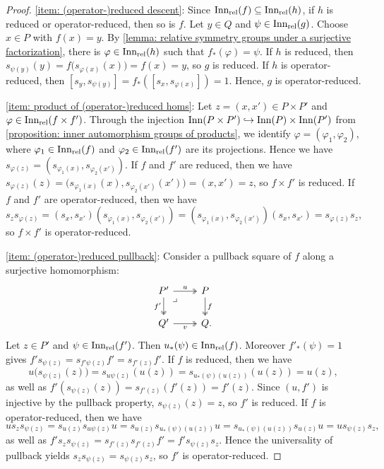 \begin{proof}
\eqref{item: (operator-)reduced descent}:
Since $\operatorname{Inn_{rel}}(f)\subseteq\operatorname{Inn_{rel}}(h)$, if $h$ is reduced or operator-reduced, then so is $f$. Let $y\in Q$ and $\psi\in\operatorname{Inn_{rel}}(g)$. Choose $x\in P$ with $f(x)=y$. By \cref{lemma: relative symmetry groups under a surjective factorization}, there is $\varphi\in\operatorname{Inn_{rel}}(h)$ such that $f_*(\varphi)=\psi$.
If $h$ is reduced, then $s_{\psi(y)}(y) = f\bigl(s_{\varphi(x)}(x)\bigr) = f(x) = y$, so $g$ is reduced.
If $h$ is operator-reduced, then $[s_y,s_{\psi(y)}] = f_*([s_x,s_{\varphi(x)}])=1$. Hence, $g$ is operator-reduced.

\eqref{item: product of (operator-)reduced homs}:
Let $z=(x,x')\in P\times P'$ and $\varphi\in\operatorname{Inn_{rel}}(f\times f')$. Through the injection $\operatorname{Inn}(P\times P') \hookrightarrow \operatorname{Inn}(P) \times \operatorname{Inn}(P')$ from \cref{proposition: inner automorphism groups of products}, we identify $\varphi=(\varphi_1,\varphi_2)$, where $\varphi_1\in\operatorname{Inn_{rel}}(f)$ and $\varphi_2\in\operatorname{Inn_{rel}}(f')$ are its projections. Hence we have $s_{\varphi(z)}=(s_{\varphi_1(x)},s_{\varphi_2(x')})$.
If $f$ and $f'$ are reduced, then we have $s_{\varphi(z)}(z)= \bigl(s_{\varphi_1(x)}(x), s_{\varphi_2(x')}(x')\bigr)=(x,x')=z$, so $f\times f'$ is reduced.
If $f$ and $f'$ are operator-reduced, then we have $s_zs_{\varphi(z)}=(s_x,s_{x'})(s_{\varphi_1(x)},s_{\varphi_2(x')}) = (s_{\varphi_1(x)},s_{\varphi_2(x')})(s_x,s_{x'}) = s_{\varphi(z)}s_z$, so $f\times f'$ is operator-reduced.

\eqref{item: (operator-)reduced pullback}:
Consider a pullback square of $f$ along a surjective homomorphism:
\[\begin{tikzcd}
P' \arrow[r, two heads, "u"] \arrow[d, two heads, "f'"']
    & P \arrow[d, two heads, "f"]\\
Q' \arrow[r, two heads, "v"']
    & Q\rlap{.} \arrow[phantom]{ul}[very near end]{\lrcorner}
\end{tikzcd}\]
Let $z\in P'$ and $\psi\in\operatorname{Inn_{rel}}(f')$. Then $u_*(\psi)\in\operatorname{Inn_{rel}}(f)$. Moreover $f'_*(\psi)=1$ gives $f's_{\psi(z)}=s_{f'\psi(z)}f'=s_{f'(z)} f'$.
If $f$ is reduced, then we have
\[ u\bigl(s_{\psi(z)}(z)\bigr) = s_{u\psi(z)}(u(z)) = s_{u_*(\psi)(u(z))}(u(z)) = u(z), \]
as well as $f'(s_{\psi(z)}(z)) = s_{f'(z)}(f'(z)) = f'(z)$. Since $(u,f')$ is injective by the pullback property, $s_{\psi(z)}(z)=z$, so $f'$ is reduced.
If $f$ is operator-reduced, then we have
\[ us_zs_{\psi(z)} = s_{u(z)}s_{u\psi(z)} u = s_{u(z)}s_{u_*(\psi)(u(z))}u = s_{u_*(\psi)(u(z))}s_{u(z)}u = u s_{\psi(z)} s_z, \]
as well as $f's_zs_{\psi(z)} = s_{f'(z)}s_{f'(z)} f' = f's_{\psi(z)} s_z$. Hence the universality of pullback yields $s_zs_{\psi(z)}= s_{\psi(z)} s_z$, so $f'$ is operator-reduced.


\end{proof}

